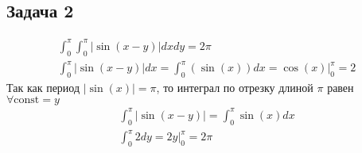 \begin{comment}
	\int_{0}^{\frac{\pi}{2}}\cos(x)^m dx = 
	\frac{(m-1)(m-3) \cdot \ldots \cdot 2}{m(m-2) \cdot \ldots \cdot 3} \int_{0}^{\frac{\pi}{2}} \cos(x)^2 dx =
	\frac{(m-1) \cdot \ldots \cdot 2}{m \cdot \ldots \cdot 3} \cdot \frac{\pi}{4}\qquad m \text{ -- нечетное}
	\end{gather*}
	В интеграле $(\sin(\theta))^\alpha$ и $(\cos(\varphi))^{\alpha + 1}$ разных четностей
	\begin{gather*}
	\int_{0}^{1} r^{\alpha + 2} dr \int_{0}^{\frac{\pi}{2}} (\sin(\theta))^{\alpha} d \theta \int_{0}^{2\pi} (\cos(\varphi))^{\alpha + 1} d \varphi =\\
	\frac{1}{\alpha + 3} \cdot \frac{(\alpha - 1)(\alpha - 3) \cdot \ldots \cdot 2}{\alpha (\alpha - 2) \cdot \ldots \cdot 3} \cdot \frac{\alpha(\alpha-2) \cdot \ldots \cdot 3}{(\alpha + 1)(\alpha - 1) \cdot \ldots \cdot 4} \cdot \frac{\pi}{4} = \\
	\frac{1}{\alpha + 3} \cdot \frac{2}{\alpha + 1} \cdot \frac{\pi}{4} =
	\frac{\pi}{(\alpha + 3)(\alpha + 1) \cdot 2}
	\end{gather*}
\end{comment}

\subsection*{Задача 2}
	\begin{gather*}
	\int_{0}^{\pi} \int_{0}^{\pi} |\sin(x-y)| dxdy = 2\pi\\
	\int_{0}^{\pi} |\sin(x-y)| dx = \int_{0}^{\pi} (\sin(x))dx = \cos(x) \bigg|_{0}^{\pi} = 2
	\end{gather*}
	Так как период $|\sin(x)| = \pi$, то интеграл по отрезку длиной $\pi$ равен $\forall \text{const} = y$
	\begin{gather*}
	\int_{0}^{\pi} |\sin(x-y)| = \int_{0}^{\pi} \sin(x) dx\\
	\int_{0}^{\pi} 2 dy = 2y \bigg|_{0}^{\pi} = 2\pi
	\end{gather*}
\vskip 0.4in


